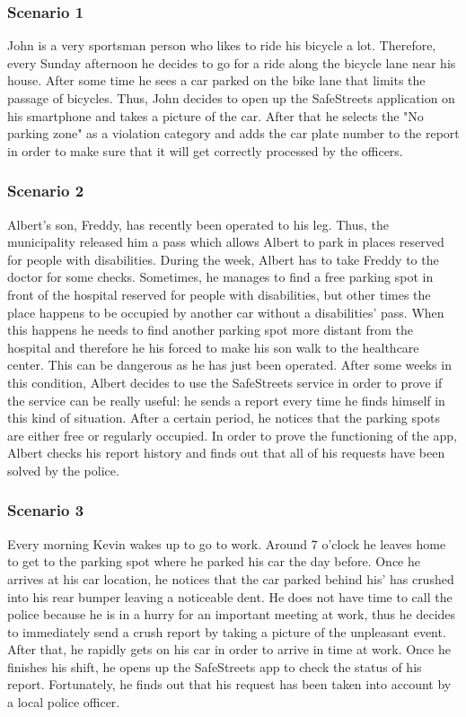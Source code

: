 \subsubsection{Scenario 1}
John is a very sportsman person who likes to ride his bicycle a lot. Therefore, every Sunday afternoon he decides to go for a ride along the bicycle lane near his house. After some time he sees a car parked on the bike lane that limits the passage of bicycles. Thus, John decides to open up the SafeStreets application on his smartphone and takes a picture of the car. After that he selects the "No parking zone" as a violation category and adds the car plate number to the report in order to make sure that it will get correctly processed by the officers. 

\subsubsection{Scenario 2}
Albert's son, Freddy, has recently been operated to his leg. Thus, the municipality released him a pass which allows Albert to park in places reserved for people with disabilities. During the week, Albert has to take Freddy to the doctor for some checks. Sometimes, he manages to find a free parking spot in front of the hospital reserved for people with disabilities, but other times the place happens to be occupied by another car without a disabilities' pass. When this happens he needs to find another parking spot more distant from the hospital and therefore he his forced to make his son walk to the healthcare center. This can be dangerous as he has just been operated. After some weeks in this condition, Albert decides to use the SafeStreets service in order to prove if the service can be really useful: he sends a report every time he finds himself in this kind of situation. After a certain period, he notices that the parking spots are either free or regularly occupied. In order to prove the functioning of the app, Albert checks his report history and finds out that all of his requests have been solved by the police.

\subsubsection{Scenario 3}
Every morning Kevin wakes up to go to work. Around 7 o'clock he leaves home to get to the parking spot where he parked his car the day before. Once he arrives at his car location, he notices that the car parked behind his' has crushed into his rear bumper leaving a noticeable dent. He does not have time to call the police because he is in a hurry for an important meeting at work, thus he decides to immediately send a crush report by taking a picture of the unpleasant event. After that, he rapidly gets on his car in order to arrive in time at work. Once he finishes his shift, he opens up the SafeStreets app to check the status of his report. Fortunately, he finds out that his request has been taken into account by a local police officer.

